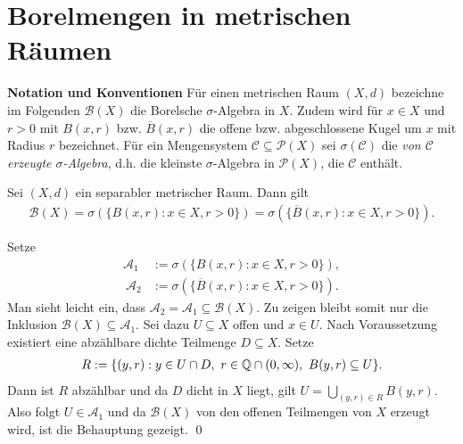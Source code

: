 \section{Borelmengen in metrischen Räumen}
\textbf{Notation und Konventionen}\newline 
Für einen metrischen Raum $(X,d)$ bezeichne im Folgenden $\mathcal{B}(X)$ die Borelsche $\sigma$-Algebra in $X$. 
Zudem wird für $x \in X$ und $r>0$ mit $B(x, r)$ bzw. $\overline{B}(x,r)$ die offene bzw. abgeschlossene Kugel um $x$ mit Radius $r$ bezeichnet. 
Für ein Mengensystem $\mathcal{C} \subseteq \mathcal{P}(X)$ sei $\sigma(\mathcal{C})$ die \textit{von $\mathcal{C}$ erzeugte $\sigma$-Algebra}, d.h. die kleinste $\sigma$-Algebra in $\mathcal{P}(X)$, die $\mathcal{C}$ enthält. 
\begin{proposition}
    Sei $(X,d)$ ein separabler metrischer Raum. Dann gilt
    \begin{align*}
        \mathcal{B}(X) = \sigma(\{B(x,r): x \in X, r > 0 \}) = \sigma(\{\overline{B}(x,r): x \in X, r > 0 \}). 
    \end{align*}
\end{proposition}
\begin{proof*}
    Setze 
    \begin{align*}
        \mathcal{A}_1 &:= \sigma(\{B(x,r): x \in X, r > 0 \}), \\\ 
        \mathcal{A}_2 &:= \sigma(\{\overline{B}(x,r): x \in X, r > 0 \}). 
    \end{align*}
    Man sieht leicht ein, dass $\mathcal{A}_2 = \mathcal{A}_1 \subseteq \mathcal{B}(X)$. Zu zeigen bleibt somit nur die Inklusion $\mathcal{B}(X) \subseteq \mathcal{A}_1$.
    Sei dazu $U \subseteq X$ offen und $x \in U$. Nach Voraussetzung existiert eine abzählbare dichte Teilmenge $D \subseteq X$. Setze  
    \begin{align*}
        R := \{(y,r) : y \in U \cap D, \ r \in \mathbb{Q} \cap (0, \infty), \  B(y,r) \subseteq U \}.
    \end{align*}
    Dann ist $R$ abzählbar und da $D$ dicht in $X$ liegt, gilt $U = \bigcup_{(y,r) \in R}B(y,r)$. 
    Also folgt $U \in \mathcal{A}_1$ und da $\mathcal{B}(X)$ von den offenen Teilmengen von $X$ erzeugt wird, ist die Behauptung gezeigt. \qed
\end{proof*}


